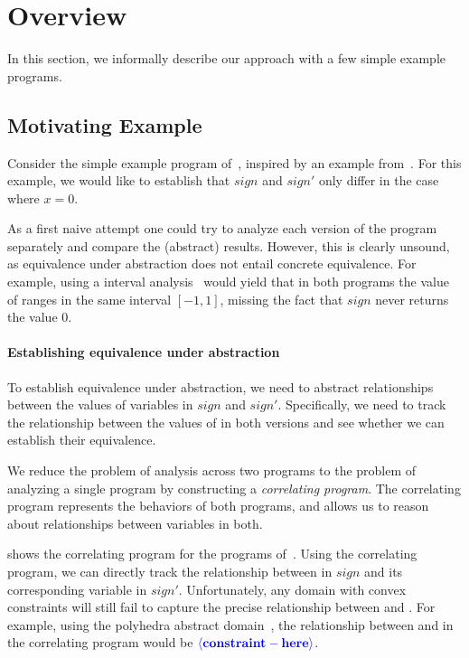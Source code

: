 \section{Overview}

In this section, we informally describe our approach with a few simple example programs.

\subsection{Motivating Example}



Consider the simple example program of~, inspired by an example from~\cite{RM:TOPLAS07}. For this example, we would like to establish that $sign$ and $sign'$ only differ in the case where $x=0$.

As a first naive attempt one could try to analyze each version of the program separately and compare the (abstract) results. However, this is clearly unsound, as equivalence under abstraction does not entail concrete equivalence. For example, using a interval analysis~\cite{TODO} would yield that in both programs the value of  ranges in the same interval $[-1,1]$, missing the fact that $sign$ never returns the value $0$.


\paragraph{Establishing equivalence under abstraction}
To establish equivalence under abstraction, we need to abstract relationships between the values of variables in $sign$ and $sign'$. Specifically, we need to track the relationship between the values of  in both versions and see whether we can establish their equivalence.

We reduce the problem of analysis across two programs to the problem of analyzing a single program by constructing a \emph{correlating program}. The correlating program represents the behaviors of both programs, and allows us to reason about relationships between variables in both. 



 shows the correlating program for the programs of~. Using the correlating program, we can directly track the relationship between  in $sign$ and its corresponding variable  in $sign'$. Unfortunately, any domain with convex constraints will still fail to capture the precise relationship between  and . For example, using the polyhedra abstract domain~\cite{TODO}, the relationship between  and  in the correlating program would be ${\color{blue} \bf \langle constraint-here \rangle}$.

